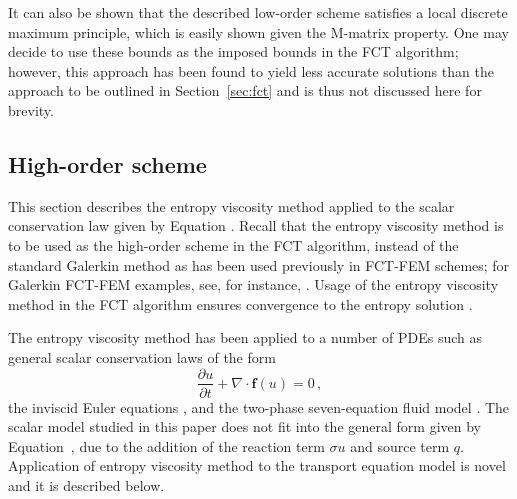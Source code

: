 \documentclass[xchauthor,chkrefs,fixeqskip,GCNS,amsmath,amsthm]{yjcphg}
\theoremstyle{remark}
\begin{document}
It can also be shown that the described low-order scheme satisfies a
local discrete maximum principle, which is easily shown given the
M-matrix property. One may decide to use these bounds as the imposed
bounds in the FCT algorithm; however, this approach has been found to
yield less accurate solutions than the approach to be outlined in
Section~\ref{sec:fct} and is thus not discussed here for brevity.

\subsection{High-order scheme}%
\label{sec:high}

This section describes the entropy viscosity method applied to the
scalar conservation law given by Equation .
Recall that the entropy viscosity method is to be used as the high-order
scheme in the FCT algorithm, instead of the standard Galerkin method as
has been used previously in FCT-FEM schemes; for Galerkin FCT-FEM
examples, see, for instance,
\cite{kuzmin_FCT,moller_2008,lohner,kuzmin_failsafe,kuzmin_closepacking}.
Usage of the entropy viscosity method in the FCT algorithm ensures
convergence to the entropy solution \cite{guermond_secondorder}.

The entropy viscosity method has been applied to a number of PDEs such
as general scalar conservation laws of the form
%
\begin{equation}
\label{eq:scalar_conservation_law}
\frac{\partial u}{\partial t} + \nabla\cdot\mathbf{f}(u) = 0 \,,
\end{equation}
%
the inviscid Euler equations \cite{guermond_ev,marco_low_mach},
and the two-phase seven-equation fluid model \cite{marco_SEM}. The
scalar model studied in this paper does not fit into the general form
given by Equation~, due to the
addition of the reaction term $\sigma u$ and source term $q$.
Application of entropy viscosity method to the transport equation model
is novel and it is described below.
\end{document}
